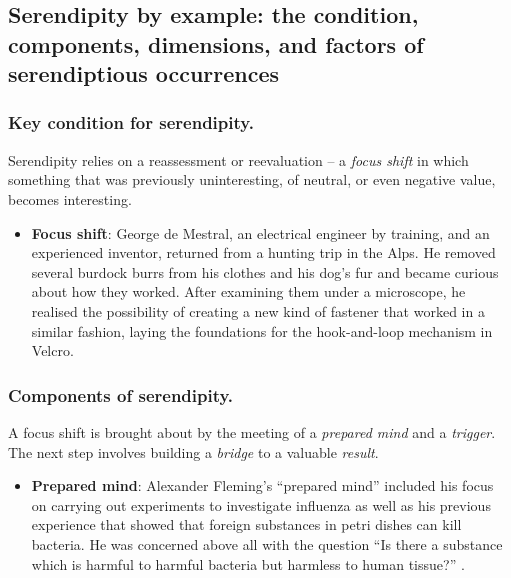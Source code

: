 %

\subsection{Serendipity by example: the condition, components, dimensions, and factors of serendiptious occurrences} \label{sec:by-example}


\subsubsection{Key condition for serendipity.}

Serendipity relies on a reassessment or reevaluation -- a \emph{focus shift} in which something that was previously uninteresting, of neutral, or even negative value, becomes interesting.

\begin{itemize}
\item \textbf{Focus shift}: George de Mestral, an electrical engineer
  by training, and an experienced inventor, returned from a hunting
  trip in the Alps.  He removed several burdock burrs from his clothes
  and his dog's fur and became curious about how they worked. After
  examining them under a microscope, he realised the possibility of
  creating a new kind of fastener that worked in a similar fashion,
  laying the foundations for the hook-and-loop mechanism in Velcro\texttrademark.
\end{itemize}

\subsubsection{Components of serendipity.}

A focus shift is brought about by the meeting of a \emph{prepared mind} and a \emph{trigger}.  The next step involves building a \emph{bridge} to a valuable \emph{result}.

\begin{itemize}
\item \textbf{Prepared mind}: 
Alexander Fleming's ``prepared mind'' included his focus
on carrying out experiments to investigate influenza as well as his
previous experience that showed that foreign substances in petri dishes can kill
bacteria.  He was concerned above all with the question ``Is there a
substance which is harmful to harmful bacteria but harmless to human
tissue?''  \cite[p. 161]{roberts}.
\end{itemize}

